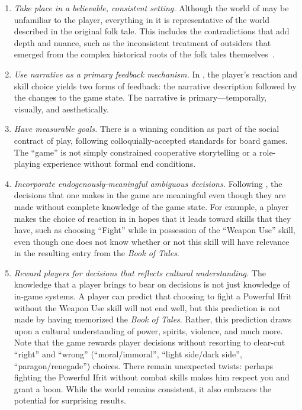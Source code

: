 \documentclass[a4paper]{article}
\begin{document}
\begin{enumerate}
\item \textit{Take place in a believable, consistent setting.} 
 Although the world of \totan{} may be unfamiliar to the player,
 everything in it is representative of the world described in the original
 folk tale.
 This includes the contradictions that add depth and nuance, such as 
 the inconsistent treatment of outsiders that emerged from the 
 complex historical roots of the folk tales themselves~\citep{Matar2008}.

\item \textit{Use narrative as a primary feedback mechanism.} 
 In \totan{}, the player's reaction and skill choice yields two forms
 of feedback: the narrative description followed by the changes to the
 game state. The narrative is primary---temporally, visually, and aesthetically.

\item \textit{Have measurable goals.} There is a winning condition as part
 of the social contract of play, following colloquially-accepted 
 standards for board games. The ``game'' is not simply constrained
 cooperative storytelling or a role-playing experience without formal end
 conditions. 

\item \textit{Incorporate endogenously-meaningful ambiguous decisions.}
 Following \citet{Burgun2012}, the decisions that one makes in the game
 are meaningful even though they are made without complete knowledge
 of the game state. For example, a player makes 
 the choice of reaction in \totan{} in hopes that it leads toward skills
 that they have, such as choosing ``Fight'' while in possession of the
 ``Weapon Use'' skill, even though one does not know whether or not
 this skill will have relevance in the resulting entry from the
 \textit{Book of Tales}.

\item \textit{Reward players for decisions that reflects
    cultural understanding.}  The knowledge that a player brings to
  bear on decisions is not just knowledge of in-game systems. 
  A player can predict that choosing to fight a Powerful Ifrit 
 without the Weapon Use skill will not end well,
  but this prediction is not made by having memorized the 
  \textit{Book of Tales}.
  Rather, this prediction draws upon a cultural understanding of power,
  spirits, violence, and much more.
  Note that the game rewards player decisions without resorting to
  clear-cut ``right'' and ``wrong'' (``moral/immoral'',
  ``light side/dark side'', ``paragon/renegade'') choices.  There
  remain unexpected twists: perhaps fighting the Powerful Ifrit without
  combat skills makes him respect you and grant a boon. 
  While the world
  remains consistent, it also embraces the potential for surprising
  results.

\end{enumerate}
\end{document}
